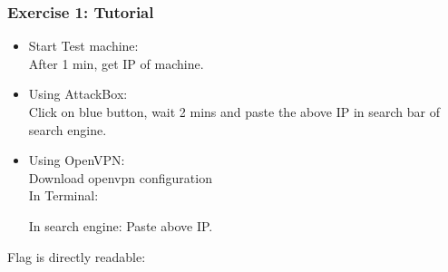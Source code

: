 \subsubsection*{Exercise 1: Tutorial}
	\begin{itemize}
		\item Start Test machine:\\
		After 1 min, get IP of machine. 
		\item Using AttackBox:\\
		Click on blue button, wait 2 mins and paste the above IP in search bar of search engine.
		\item Using OpenVPN: \\
		Download openvpn configuration\\
		In Terminal: 
		\begin{center}
		\end{center}
		In search engine:
		Paste above IP.		
	\end{itemize}
	Flag is directly readable:
	\begin{flag}
	\end{flag}